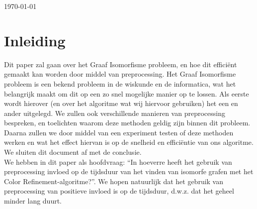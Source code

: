 \documentclass{article}
\begin{document}
\begin{titlepage}

		{\large \today}\\[3cm]

		\pagebreak

\end{titlepage}


\renewcommand*\contentsname{Inhoudsopgave}
\tableofcontents{}
\pagebreak


\section{Inleiding}
Dit paper zal gaan over het Graaf Isomorfisme probleem, en hoe dit effici\"ent gemaakt kan worden door middel van preprocessing. Het Graaf Isomorfisme probleem is een bekend probleem in de wiskunde en de informatica, wat het belangrijk maakt om dit op een zo snel mogelijke manier op te lossen. Als eerste wordt hierover (en over het algoritme wat wij hiervoor gebruiken) het een en ander uitgelegd. We zullen ook verschillende manieren van preprocessing bespreken, en toelichten waarom deze methoden geldig zijn binnen dit probleem. Daarna zullen we door middel van een experiment testen of deze methoden werken en wat het effect hiervan is op de snelheid en effici\"entie van ons algoritme. We sluiten dit document af met de conclusie.\\

We hebben in dit paper als hoofdvraag: ``In hoeverre heeft het gebruik van preprocessing invloed op de tijdsduur van het vinden van isomorfe grafen met het Color Refinement-algoritme?''. We hopen natuurlijk dat het gebruik van preprocessing van positieve invloed is op de tijdsduur, d.w.z. dat het geheel minder lang duurt.
\pagebreak

\end{document}
